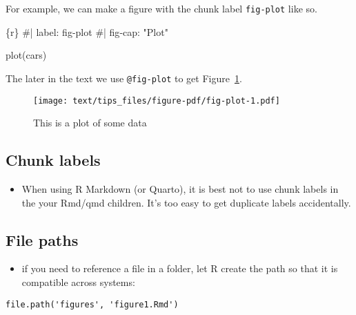 \documentclass[
  letterpaper,
  oneside]{scrbook}
\newenvironment{Shaded}{\begin{snugshade}}{\end{snugshade}}
\newcommand{\NormalTok}[1]{\textcolor[rgb]{0.00,0.23,0.31}{#1}}
\providecommand{\tightlist}{%
  \setlength{\itemsep}{0pt}\setlength{\parskip}{0pt}}\usepackage{longtable,booktabs,array}
\begin{document}
For example, we can make a figure with the chunk label \texttt{fig-plot}
like so.

\begin{Shaded}
\begin{Highlighting}[]
\NormalTok{\textasciigrave{}\textasciigrave{}\textasciigrave{}\{r\}}
\NormalTok{\#| label: fig{-}plot}
\NormalTok{\#| fig{-}cap: "Plot"}

\NormalTok{plot(cars)}
\NormalTok{\textasciigrave{}\textasciigrave{}\textasciigrave{}}
\end{Highlighting}
\end{Shaded}

The later in the text we use \texttt{@fig-plot} to get
Figure~\ref{fig-plot}.

\begin{figure}

{\centering \texttt{[image: text/tips\_files/figure-pdf/fig-plot-1.pdf]}

}

\caption{\label{fig-plot}This is a plot of some data}

\end{figure}

\hypertarget{chunk-labels}{%
\subsection{Chunk labels}\label{chunk-labels}}

\begin{itemize}
\tightlist
\item
  When using R Markdown (or Quarto), it is best not to use chunk labels
  in the your Rmd/qmd children. It's too easy to get duplicate labels
  accidentally.
\end{itemize}

\hypertarget{file-paths}{%
\subsection{File paths}\label{file-paths}}

\begin{itemize}
\tightlist
\item
  if you need to reference a file in a folder, let R create the path so
  that it is compatible across systems:
\end{itemize}

\begin{verbatim}
file.path('figures', 'figure1.Rmd')
\end{verbatim}
\end{document}
